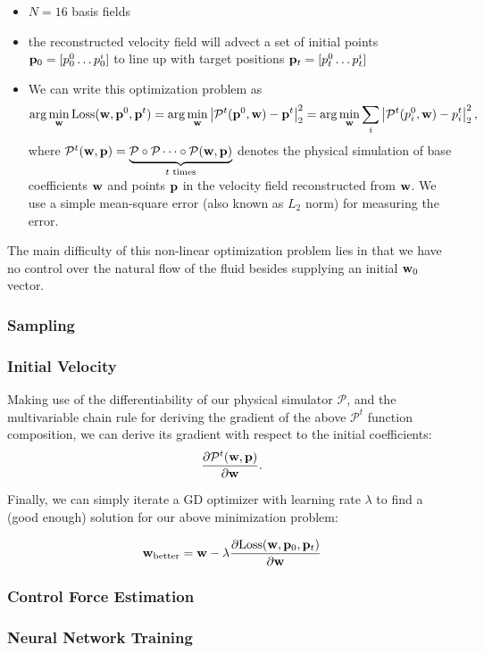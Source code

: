 \begin{itemize}
  \item $N=16$ basis fields
  \item the reconstructed velocity field will advect a set of initial points
$\vb{p}_0 = [p^0_0\dots p^i_0]$ to line up with target positions 
$\vb{p}_{t} = [p_t^0\dots p_t^i]$
  \item We can write this optimization problem as 
$$\arg\min_{\vb{w}} \text{Loss}(\vb{w}, \vb{p}^0, \vb{p}^t)
= \arg\min_{\vb{w}} \left| \mathcal{P}^{t}(\vb{p}^0, \vb{w})
- \vb{p}^t\right|_2^2 = \arg\min_{\vb{w}}
\sum_{i}\left|\mathcal{P}^{t}(p^0_i, \vb{w}) - p^t_i\right|_2^2, $$
where $\mathcal{P}^t(\vb{w}, \vb{p}) = \underbrace{\mathcal{P} \circ
\mathcal{P} \dots \circ \mathcal{P}(\vb{w}, \vb{p})}_{t \text{ times}}$
denotes the physical simulation of base coefficients $\vb{w}$ and 
points $\vb{p}$ in the velocity field reconstructed from $\vb{w}$. We
use a simple mean-square error (also known as $L_2$ norm) for measuring the error.
\end{itemize}

The main difficulty of this non-linear optimization problem lies in that we have
no control over the natural flow of the fluid besides supplying an initial
$\vb{w}_0$ vector.

\subsubsection*{Sampling}



\subsubsection{Initial Velocity}
Making use of the differentiability of our physical simulator $\mathcal{P}$, and
the multivariable chain rule for deriving the gradient of the above
$\mathcal{P}^t$ function composition, we can derive its gradient with respect to
the initial coefficients: $$\frac{\partial
\mathcal{P}^t(\vb{w},\vb{p})}{\partial \vb{w}}.$$

Finally, we can simply iterate a \ac{GD} optimizer with learning rate $\lambda$
to find a (good enough) solution for our above minimization problem:

$$\vb{w}_{\text{better}} = \vb{w} - \lambda
\frac{
    \partial\text{Loss}(\vb{w}, \vb{p}_0, \vb{p}_t)
}{
    \partial \vb{w}
}$$
\subsubsection{Control Force Estimation}

\subsubsection{Neural Network Training}
